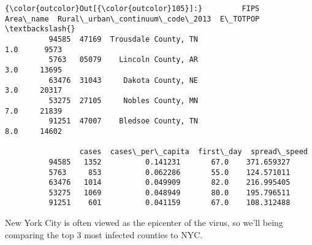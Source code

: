 \documentclass[11pt]{article}
\begin{document}
\begin{Verbatim}[commandchars=\\\{\}]
{\color{outcolor}Out[{\color{outcolor}105}]:}         FIPS             Area\_name  Rural\_urban\_continuum\_code\_2013  E\_TOTPOP  \textbackslash{}
          94585  47169  Trousdale County, TN                              1.0      9573   
          5763   05079    Lincoln County, AR                              3.0     13695   
          63476  31043     Dakota County, NE                              3.0     20317   
          53275  27105     Nobles County, MN                              7.0     21839   
          91251  47007    Bledsoe County, TN                              8.0     14602   
          
                 cases  cases\_per\_capita  first\_day  spread\_speed  
          94585   1352          0.141231       67.0    371.659327  
          5763     853          0.062286       55.0    124.571011  
          63476   1014          0.049909       82.0    216.995405  
          53275   1069          0.048949       80.0    195.796511  
          91251    601          0.041159       67.0    108.312488  
\end{Verbatim}
            
    New York City is often viewed as the epicenter of the virus, so we'll
being comparing the top 3 most infected counties to NYC.
\end{document}
